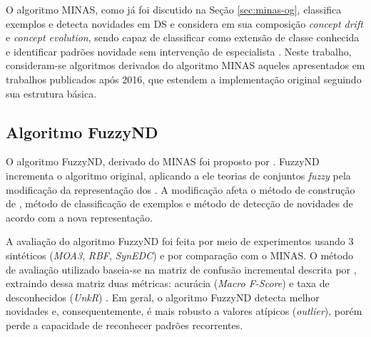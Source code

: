 


O algoritmo MINAS, como já foi discutido na Seção \ref{sec:minas-og}, classifica
exemplos e detecta
novidades em DS e considera em sua composição \emph{concept drift} e
\emph{concept evolution}, sendo capaz de classificar como extensão de classe
conhecida e identificar padrões novidade sem intervenção de especialista
\cite{Faria2015minas}.
Neste trabalho, consideram-se algoritmos derivados do algoritmo MINAS
aqueles apresentados em trabalhos publicados após 2016, que estendem a
implementação original seguindo sua estrutura básica.

\subsection{Algoritmo FuzzyND}


O algoritmo FuzzyND, derivado do MINAS foi proposto por .
FuzzyND incrementa o algoritmo original, aplicando a ele teorias de
conjuntos \emph{fuzzy} pela modificação da representação dos \clusters.
A modificação afeta o método de construção de \clusters, método de classificação
de exemplos e método de detecção de novidades de acordo com a nova representação.


A avaliação do algoritmo FuzzyND foi feita por meio de experimentos usando 3 
\datasets sintéticos (\emph{MOA3}, \emph{RBF}, \emph{SynEDC})
e por comparação com o MINAS.
O método de avaliação utilizado baseia-se na matriz de confusão incremental
descrita por , extraindo dessa matriz duas métricas:
acurácia (\emph{Macro F-Score}) \cite{Sokolova2009} e
taxa de desconhecidos (\emph{UnkR}) \cite{Faria2015minas}.
Em geral, o algoritmo FuzzyND detecta melhor novidades e, consequentemente,
é mais robusto a valores atípicos (\emph{outlier}), porém perde a capacidade
de reconhecer padrões recorrentes.


